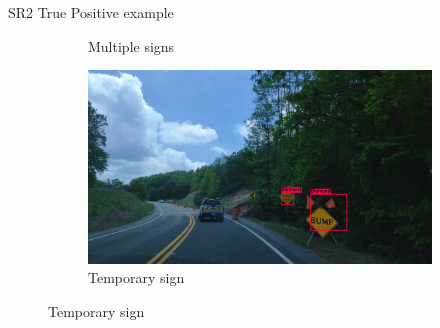 \documentclass{beamer}
\newcommand{\backupend}{
   \addtocounter{framenumberappendix}{-\value{framenumber}}
   \addtocounter{framenumber}{\value{framenumberappendix}} 
}
\begin{document}
\begin{frame}{SR2 True Positive example}
\begin{figure}
\begin{center}
\begin{subfigure}[t]{.49\linewidth}
          \caption{Multiple signs}
          \label{fig:multipleTP}
        \end{subfigure}
        \begin{subfigure}[t]{.49\linewidth}
          \centering
          \includegraphics[width=0.99\linewidth]{figures/examples/sr2/TP/TP_02.png}
          \caption{Temporary sign}
          \label{fig:bigtempTP}
        \end{subfigure}
        \label{fig:TPcases}
      \end{center}
    \end{figure}
\end{frame}{}


\backupend
\end{document}
